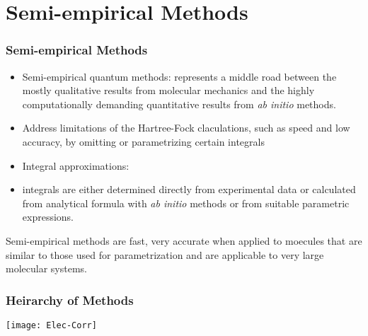 \documentclass[slidestop,mathserif,compress,xcolor=svgnames]{beamer}
\begin{document}
\section{Semi-empirical Methods}
\begin{frame}
\frametitle{\small Semi-empirical Methods}
\footnotesize{
\begin{itemize}
\item Semi-empirical quantum methods: represents a middle road between the mostly qualitative results from molecular mechanics and the highly computationally demanding quantitative results from \emph{ab initio} methods.
\item Address limitations of the Hartree-Fock claculations, such as speed and low accuracy, by omitting or parametrizing certain integrals
\item Integral approximations:
\item integrals are either determined directly from experimental data or calculated from analytical formula with \emph{ab initio} methods or from suitable parametric expressions.
\end{itemize}
\begin{block}{}
Semi-empirical methods are fast, very accurate when applied to moecules that are similar to those used for parametrization and are applicable to very large molecular systems.
\end{block}
}
\end{frame}

\begin{frame}
\frametitle{\small Heirarchy of Methods}
\begin{center}
\vspace{-1cm}
\texttt{[image: Elec-Corr]}%
\end{center}
\end{frame}
\end{document}
